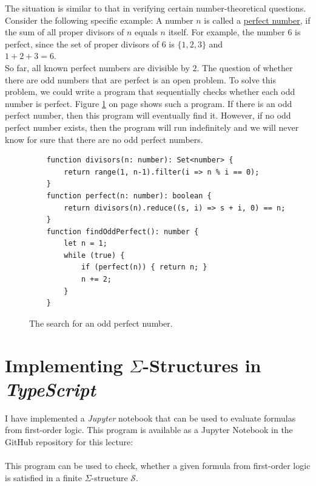 The situation is similar to that in verifying certain number-theoretical
questions. Consider the following specific example: A number $n$ is called 
a \href{https://en.wikipedia.org/wiki/Perfect_number}{perfect number},
if the sum of all proper divisors of $n$ equals $n$ itself. For example, the number $6$ is perfect, since the set of proper divisors of $6$ is $\{1,2,3\}$ and 
\\[0.2cm]
\hspace*{1.3cm}
$1 + 2 + 3 = 6$.
\\[0.2cm]
So far, all known perfect numbers are divisible by $2$. The question of whether there are
odd numbers that are perfect is an open  problem. To solve this
problem, we could write a program that sequentially checks whether each
odd number is perfect. Figure \ref{fig:Find-Perfect.ipynb}
on page \pageref{fig:Find-Perfect.ipynb} shows such a program. If there is an odd perfect number,
then this program will eventually find it. However, if no
odd perfect number exists, then the program will run indefinitely and
we will never know for sure that there are no odd perfect numbers.

\begin{figure}[!ht]
  \centering
\begin{verbatim}
    function divisors(n: number): Set<number> {
        return range(1, n-1).filter(i => n % i == 0);
    }
    function perfect(n: number): boolean {
        return divisors(n).reduce((s, i) => s + i, 0) == n;
    }
    function findOddPerfect(): number {
        let n = 1;
        while (true) {
            if (perfect(n)) { return n; }
            n += 2;
        }
    }
\end{verbatim}
\vspace*{-0.3cm}
  \caption{The search for an odd perfect number.}
  \label{fig:Find-Perfect.ipynb}
\end{figure} 

\section{Implementing $\Sigma$-Structures in \textsl{TypeScript}}
I have implemented a \textsl{Jupyter} notebook that can be used to evaluate formulas from first-order logic.
This program is available as a Jupyter Notebook in the GitHub repository for this lecture:
\\[0.2cm]
\hspace*{1.3cm}
\href{https://github.com/karlstroetmann/Logic/blob/master/TypeScript/Chapter-5/01-FOL-Evaluation.ipynb}{}
\\[0.2cm]
This program can be used to check, whether a given formula from first-order logic is satisfied in a finite
$\Sigma$-structure $\mathcal{S}$.

